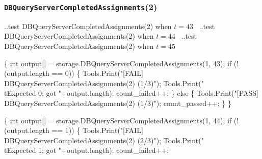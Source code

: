 \documentclass{article}
\def\nwendcode{\endtrivlist \endgroup}
\let\nwdocspar=\par
\begin{document}
\subsubsection{{\tt{}DBQueryServerCompletedAssignments}(2)}
\nwenddocs{}\endmoddef{}
  \LA{}..test \code{}DBQueryServerCompletedAssignments\edoc{}(2) when $t=43$~{\nwtagstyle{}}\RA{}
  \LA{}..test \code{}DBQueryServerCompletedAssignments\edoc{}(2) when $t=44$~{\nwtagstyle{}}\RA{}
  \LA{}..test \code{}DBQueryServerCompletedAssignments\edoc{}(2) when $t=45$~{\nwtagstyle{}}\RA{}
\nwendcode{}\nwdocspar
\nwenddocs{}\endmoddef{}
\{
  int output[] = storage.DBQueryServerCompletedAssignments(1, 43);
  if (!(output.length == 0)) \{
    Tools.Print("[FAIL] DBQueryServerCompletedAssignments(2) (1/3)");
    Tools.Print("\\tExpected 0; got "+output.length);
    count_failed++;
  \} else \{
    Tools.Print("[PASS] DBQueryServerCompletedAssignments(2) (1/3)");
    count_passed++;
  \}
\}
\nwendcode{}\nwdocspar
\nwenddocs{}\endmoddef{}
\{
  int output[] = storage.DBQueryServerCompletedAssignments(1, 44);
  if (!(output.length == 1)) \{
    Tools.Print("[FAIL] DBQueryServerCompletedAssignments(2) (2/3)");
    Tools.Print("\\tExpected 1; got "+output.length);
    count_failed++;
\end{document}

